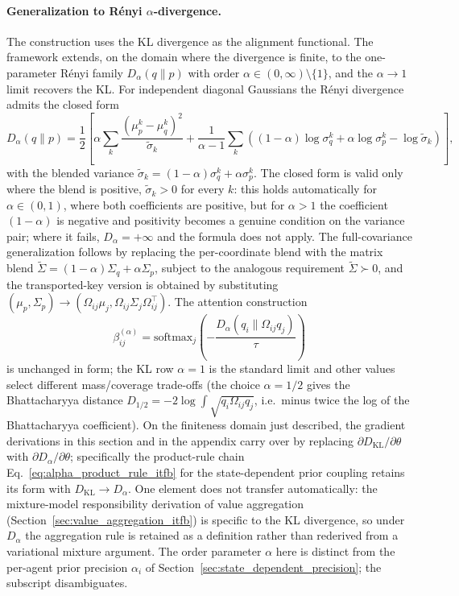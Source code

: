 \paragraph{Generalization to R\'enyi $\alpha$-divergence.}
The construction uses the KL divergence as the alignment functional. The framework extends, on the domain where the divergence is finite, to the one-parameter R\'enyi family $D_\alpha(q \| p)$ with order $\alpha \in (0, \infty) \setminus \{1\}$, and the $\alpha \to 1$ limit recovers the KL. For independent diagonal Gaussians the R\'enyi divergence admits the closed form
\begin{equation}
D_\alpha(q \| p) = \frac{1}{2}\left[ \alpha \sum_k \frac{(\mu_p^k - \mu_q^k)^2}{\tilde\sigma_k} + \frac{1}{\alpha - 1} \sum_k \left((1-\alpha)\log \sigma_q^k + \alpha \log \sigma_p^k - \log \tilde\sigma_k\right) \right],
\label{eq:renyi_diagonal_itfb}
\end{equation}
with the blended variance $\tilde\sigma_k = (1-\alpha)\sigma_q^k + \alpha\sigma_p^k$. The closed form is valid only where the blend is positive, $\tilde\sigma_k > 0$ for every $k$: this holds automatically for $\alpha \in (0,1)$, where both coefficients are positive, but for $\alpha > 1$ the coefficient $(1-\alpha)$ is negative and positivity becomes a genuine condition on the variance pair; where it fails, $D_\alpha = +\infty$ and the formula does not apply. The full-covariance generalization follows by replacing the per-coordinate blend with the matrix blend $\tilde\Sigma = (1-\alpha)\Sigma_q + \alpha \Sigma_p$, subject to the analogous requirement $\tilde\Sigma \succ 0$, and the transported-key version is obtained by substituting $(\mu_p, \Sigma_p) \to (\Omega_{ij}\mu_j, \Omega_{ij}\Sigma_j\Omega_{ij}^\top)$. The attention construction
\begin{equation}
\beta_{ij}^{(\alpha)} = \mathrm{softmax}_j\left(-\frac{D_\alpha(q_i \| \Omega_{ij} q_j)}{\tau}\right)
\label{eq:renyi_attention_itfb}
\end{equation}
is unchanged in form; the KL row $\alpha = 1$ is the standard limit and other values select different mass/coverage trade-offs (the choice $\alpha = 1/2$ gives the Bhattacharyya distance $D_{1/2} = -2\log\int\sqrt{q_i \Omega_{ij}q_j}$, i.e.\ minus twice the log of the Bhattacharyya coefficient). On the finiteness domain just described, the gradient derivations in this section and in the appendix carry over by replacing $\partial D_{\mathrm{KL}}/\partial \theta$ with $\partial D_\alpha/\partial \theta$; specifically the product-rule chain Eq.~\eqref{eq:alpha_product_rule_itfb} for the state-dependent prior coupling retains its form with $D_{\mathrm{KL}} \to D_\alpha$. One element does not transfer automatically: the mixture-model responsibility derivation of value aggregation (Section~\ref{sec:value_aggregation_itfb}) is specific to the KL divergence, so under $D_\alpha$ the aggregation rule is retained as a definition rather than rederived from a variational mixture argument. The order parameter $\alpha$ here is distinct from the per-agent prior precision $\alpha_i$ of Section~\ref{sec:state_dependent_precision}; the subscript disambiguates.

